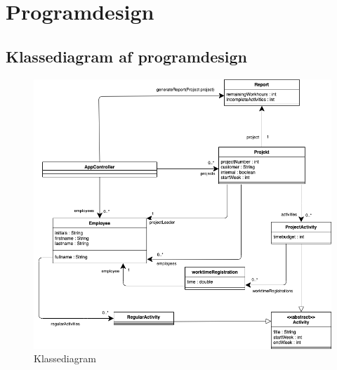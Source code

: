 \section{Programdesign}
\subsection{Klassediagram af programdesign}
\begin{figure}[H]
    \centering
    \caption{Klassediagram}\label{fig:ClassDiag}
    \includegraphics[width = .75\textwidth]{Diagrams/Klassediagram_eng.png}
\end{figure}

